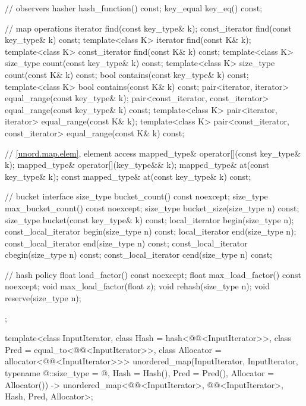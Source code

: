\begin{codeblock}
{{    // observers
    hasher hash_function() const;
    key_equal key_eq() const;

    // map operations
    iterator         find(const key_type& k);
    const_iterator   find(const key_type& k) const;
    template<class K>
      iterator       find(const K& k);
    template<class K>
      const_iterator find(const K& k) const;
    template<class K>
    size_type        count(const key_type& k) const;
    template<class K>
      size_type      count(const K& k) const;
    bool             contains(const key_type& k) const;
    template<class K>
      bool           contains(const K& k) const;
    pair<iterator, iterator>               equal_range(const key_type& k);
    pair<const_iterator, const_iterator>   equal_range(const key_type& k) const;
    template<class K>
      pair<iterator, iterator>             equal_range(const K& k);
    template<class K>
      pair<const_iterator, const_iterator> equal_range(const K& k) const;

    // \ref{unord.map.elem}, element access
    mapped_type& operator[](const key_type& k);
    mapped_type& operator[](key_type&& k);
    mapped_type& at(const key_type& k);
    const mapped_type& at(const key_type& k) const;

    // bucket interface
    size_type bucket_count() const noexcept;
    size_type max_bucket_count() const noexcept;
    size_type bucket_size(size_type n) const;
    size_type bucket(const key_type& k) const;
    local_iterator begin(size_type n);
    const_local_iterator begin(size_type n) const;
    local_iterator end(size_type n);
    const_local_iterator end(size_type n) const;
    const_local_iterator cbegin(size_type n) const;
    const_local_iterator cend(size_type n) const;

    // hash policy
    float load_factor() const noexcept;
    float max_load_factor() const noexcept;
    void max_load_factor(float z);
    void rehash(size_type n);
    void reserve(size_type n);
  };

  template<class InputIterator,
           class Hash = hash<@@<InputIterator>>,
           class Pred = equal_to<@@<InputIterator>>,
           class Allocator = allocator<@@<InputIterator>>>
    unordered_map(InputIterator, InputIterator, typename @\seebelow@::size_type = @\seebelow@,
                  Hash = Hash(), Pred = Pred(), Allocator = Allocator())
      -> unordered_map<@@<InputIterator>, @@<InputIterator>, Hash, Pred,
                       Allocator>;

}
\end{codeblock}
